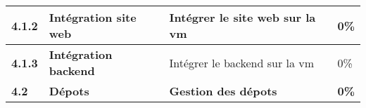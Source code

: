 \begin{supertabular}{|p{1.5cm} p{6cm}|p{5cm}|R{2cm}|}
  \hspace{6pt}
  \textbf{4.1.2}  & \textbf{Intégration site web} & Intégrer le site web sur la vm & 0\% \\
  \hline

  \hspace{6pt}
  \textbf{4.1.3}  & \textbf{Intégration backend} & Intégrer le backend sur la vm & 0\% \\
  \hline


  \textbf{4.2}  & \textbf{Dépots} & \textbf{Gestion des dépots} & \textbf{0\%} \\
  \hline



\end{supertabular}
\normalsize
